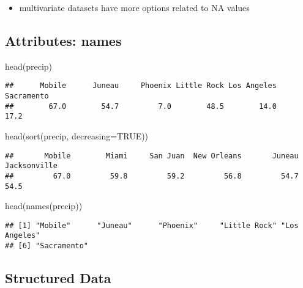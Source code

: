\documentclass[
]{book}
\newenvironment{Shaded}{\begin{snugshade}}{\end{snugshade}}
\newcommand{\AttributeTok}[1]{\textcolor[rgb]{0.77,0.63,0.00}{#1}}
\newcommand{\ConstantTok}[1]{\textcolor[rgb]{0.00,0.00,0.00}{#1}}
\newcommand{\FunctionTok}[1]{\textcolor[rgb]{0.00,0.00,0.00}{#1}}
\newcommand{\NormalTok}[1]{#1}
\providecommand{\tightlist}{%
  \setlength{\itemsep}{0pt}\setlength{\parskip}{0pt}}
\theoremstyle{definition}
\theoremstyle{definition}
\theoremstyle{definition}
\theoremstyle{definition}
\theoremstyle{remark}
\begin{document}
\begin{itemize}
\tightlist
\item
  multivariate datasets have more options related to NA values
\end{itemize}

\hypertarget{attributes-names}{%
\subsection{Attributes: names}\label{attributes-names}}

\begin{Shaded}
\begin{Highlighting}[]
\FunctionTok{head}\NormalTok{(precip)}
\end{Highlighting}
\end{Shaded}

\begin{verbatim}
##      Mobile      Juneau     Phoenix Little Rock Los Angeles  Sacramento 
##        67.0        54.7         7.0        48.5        14.0        17.2
\end{verbatim}

\begin{Shaded}
\begin{Highlighting}[]
\FunctionTok{head}\NormalTok{(}\FunctionTok{sort}\NormalTok{(precip, }\AttributeTok{decreasing=}\ConstantTok{TRUE}\NormalTok{))}
\end{Highlighting}
\end{Shaded}

\begin{verbatim}
##       Mobile        Miami     San Juan  New Orleans       Juneau Jacksonville 
##         67.0         59.8         59.2         56.8         54.7         54.5
\end{verbatim}

\begin{Shaded}
\begin{Highlighting}[]
\FunctionTok{head}\NormalTok{(}\FunctionTok{names}\NormalTok{(precip))}
\end{Highlighting}
\end{Shaded}

\begin{verbatim}
## [1] "Mobile"      "Juneau"      "Phoenix"     "Little Rock" "Los Angeles"
## [6] "Sacramento"
\end{verbatim}

\hypertarget{structured-data}{%
\subsection{Structured Data}\label{structured-data}}
\end{document}
